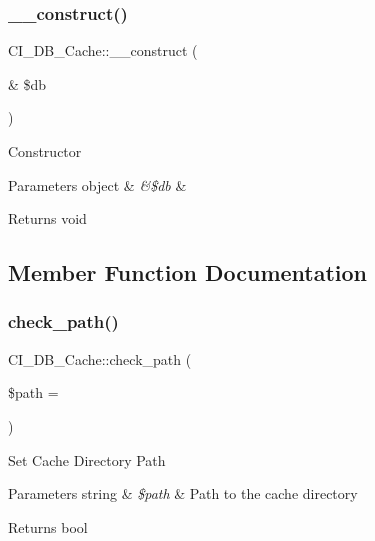 \subsubsection{\texorpdfstring{\+\_\+\+\_\+construct()}{\_\_construct()}}
{\footnotesize\ttfamily C\+I\+\_\+\+D\+B\+\_\+\+Cache\+::\+\_\+\+\_\+construct (\begin{DoxyParamCaption}\item[{\&}]{\$db }\end{DoxyParamCaption})}

Constructor


\begin{DoxyParams}[1]{Parameters}
object & {\em \&\$db} & \\
\hline
\end{DoxyParams}
\begin{DoxyReturn}{Returns}
void 
\end{DoxyReturn}


\subsection{Member Function Documentation}
\mbox{\label{class_c_i___d_b___cache_afd3a5177d51d87c81d8fd830b05fa3fb}} 
\subsubsection{\texorpdfstring{check\+\_\+path()}{check\_path()}}
{\footnotesize\ttfamily C\+I\+\_\+\+D\+B\+\_\+\+Cache\+::check\+\_\+path (\begin{DoxyParamCaption}\item[{}]{\$path = {\ttfamily \textquotesingle{}\textquotesingle{}} }\end{DoxyParamCaption})}

Set Cache Directory Path


\begin{DoxyParams}[1]{Parameters}
string & {\em \$path} & Path to the cache directory \\
\hline
\end{DoxyParams}
\begin{DoxyReturn}{Returns}
bool 
\end{DoxyReturn}
\mbox{\label{class_c_i___d_b___cache_a124770c2acc57cedb613d6ac9d2d929e}} 

